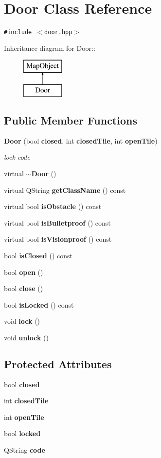 \section{Door Class Reference}
\label{classDoor}
{\tt \#include $<$door.hpp$>$}

Inheritance diagram for Door::\begin{figure}[H]
\begin{center}
\leavevmode
\includegraphics[height=2cm]{classDoor}
\end{center}
\end{figure}
\subsection*{Public Member Functions}
\begin{CompactItemize}
\item 
{\bf Door} (bool {\bf closed}, int {\bf closed\-Tile}, int {\bf open\-Tile})
\begin{CompactList}\small\item\em lock code \item\end{CompactList}\item 
virtual {\bf $\sim$Door} ()
\item 
virtual QString {\bf get\-Class\-Name} () const 
\item 
virtual bool {\bf is\-Obstacle} () const 
\item 
virtual bool {\bf is\-Bulletproof} () const 
\item 
virtual bool {\bf is\-Visionproof} () const 
\item 
bool {\bf is\-Closed} () const 
\item 
bool {\bf open} ()
\item 
bool {\bf close} ()
\item 
bool {\bf is\-Locked} () const 
\item 
void {\bf lock} ()
\item 
void {\bf unlock} ()
\end{CompactItemize}
\subsection*{Protected Attributes}
\begin{CompactItemize}
\item 
bool {\bf closed}
\item 
int {\bf closed\-Tile}
\item 
int {\bf open\-Tile}
\item 
bool {\bf locked}
\item 
QString {\bf code}
\end{CompactItemize}


